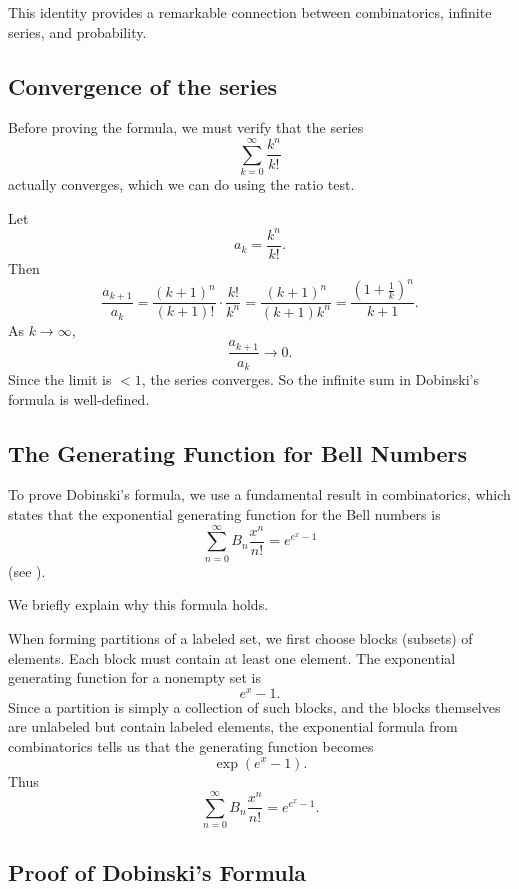 \documentclass[12pt]{amsart}
\theoremstyle{plain}
\theoremstyle{definition}
\theoremstyle{remark}
\begin{document}
This identity provides a remarkable connection between combinatorics, infinite series, and probability.

\subsection{Convergence of the series}

Before proving the formula, we must verify that the series
$$\sum_{k = 0}^\infty \frac{k^n}{k!}$$
actually converges, which we can do using the ratio test.

Let
$$a_k = \frac{k^n}{k!}.$$
Then
$$\frac{a_{k + 1}}{a_k} = \frac{(k + 1)^n}{(k + 1)!} \cdot \frac{k!}{k^n} = \frac{(k + 1)^n}{(k + 1)k^n} = \frac{(1 + \frac{1}{k})^n}{k + 1}.$$
As $k \to \infty$,
$$\frac{a_{k + 1}}{a_k} \to 0.$$
Since the limit is $< 1$, the series converges. So the infinite sum in Dobinski's formula is well-defined.

\subsection{The Generating Function for Bell Numbers}
To prove Dobinski's formula, we use a fundamental result in combinatorics, which states that the exponential generating function for the Bell numbers is
$$\sum_{n = 0}^\infty B_n \frac{x^n}{n!} = e^{e^x - 1}$$
(see \cite{Stanley}).

We briefly explain why this formula holds.

When forming partitions of a labeled set, we first choose blocks (subsets) of elements. Each block must contain at least one element. The exponential generating function for a nonempty set is
$$e^x - 1.$$
Since a partition is simply a collection of such blocks, and the blocks themselves are unlabeled but contain labeled elements, the exponential formula from combinatorics tells us that the generating function becomes
$$\exp(e^x - 1).$$
Thus
$$\sum_{n = 0}^\infty B_n \frac{x^n}{n!} = e^{e^x - 1}.$$

\subsection{Proof of Dobinski's Formula}
\end{document}
